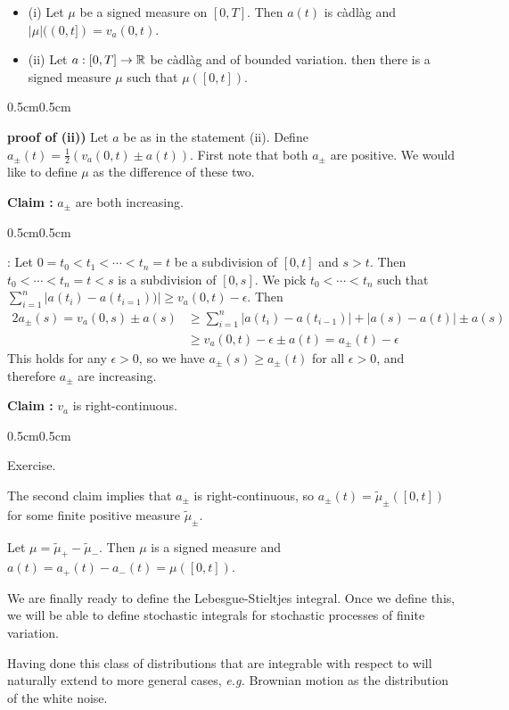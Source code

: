 \documentclass[12pt,a4paper]{article}
\newenvironment{proof}
{\begin{changemargin}{0.5cm}{0.5cm} 
	}%
	{\end{changemargin}
}
\newenvironment{subproof}
{\begin{changemargin}{0.5cm}{0.5cm} 
	}%
	{\end{changemargin}
}
\renewenvironment{i}
{\begin{itemize} 
	}%
	{\end{itemize}
}
\newenvironment{p}
{\begin{proof} 
	}%
	{\end{proof}
}
\begin{document}
\prop \begin{i}
\item[(i)] Let $\mu$ be a signed measure on $[0,T]$. Then $a(t)$ is c\`adl\`ag and $|\mu|((0,t]) = v_a(0,t)$.
\item[(ii)] Let $a: [0,T] \rightarrow \mathbb{R}$ be c\`adl\`ag and of bounded variation. then there is a signed measure $\mu$ such that $\mu([0,t])$.
\end{i}
\begin{p}
\textbf{proof of (ii))} Let $a$ be as in the statement (ii). Define $a_{\pm} (t) = \frac{1}{2} (v_a(0,t)\pm a(t))$. First note that both $a_{\pm}$ are positive. We would like to define $\mu$ as the difference of these two.

\textbf{Claim :} $a_{\pm}$ are both increasing.
\begin{subproof}
: Let $0=t_0 < t_1<\cdots < t_n =t$ be a subdivision of $[0,t]$ and $s>t$. Then $t_0 < \cdots< t_n =t<s$ is a subdivision of $[0,s]$. We pick $t_0<\cdots < t_n$ such that $\sum_{i=1}^n |a(t_i)- a(t_{i=1}))| \geq v_a(0,t) - \epsilon$. Then
\begin{align*}
2a_{\pm}(s) = v_a(0,s) \pm a(s) &\geq \sum_{i=1}^n |a(t_i) - a(t_{i-1})| + |a(s) - a(t)| \pm a(s) \\
& \geq v_a(0,t) - \epsilon \pm a(t) = a_{\pm}(t) - \epsilon
\end{align*}
This holds for any $\epsilon >0$, so we have $a_{\pm}(s) \geq a_{\pm}(t)$ for all $\epsilon>0$, and therefore $a_{\pm}$ are increasing.
\end{subproof} 
\textbf{Claim :} $v_a$ is right-continuous.
\begin{subproof}
Exercise.
\end{subproof}
The second claim implies that $a_{\pm}$ is right-continuous, so $a_{\pm}(t) = \tilde{\mu}_{\pm}([0,t])$ for some finite positive measure $\tilde{\mu}_{\pm}$.

\quad Let $\mu = \tilde{\mu}_+ - \tilde{\mu}_-$. Then $\mu$ is a signed measure and $a(t) = a_+(t) - a_-(t) =\mu ([0,t])$.

\eop
\end{p}
\s

We are finally ready to define the Lebesgue-Stieltjes integral. Once we define this, we will be able to define stochastic integrals for stochastic processes of finite variation.

\quad Having done this class of distributions that are integrable with respect to will naturally extend to more general cases, \textit{e.g.} Brownian motion as the distribution of the white noise.
\s
\end{document}
